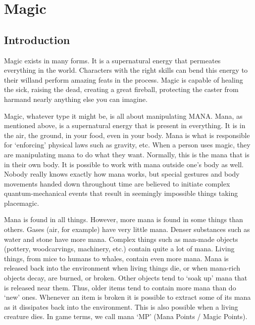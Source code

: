 \documentclass[twoside]{book}
\begin{document}
    

\chapter{Magic}
    
    

\section{Introduction}
    
    {  
      Magic exists in many forms. It is a supernatural
             energy that permeates everything in the world. Characters
             with the right skills can bend this energy to their
             willand perform amazing feats in the process. Magic
             is capable of healing the sick, raising the dead, creating a
             great fireball, protecting the caster from harmand
             nearly anything else you can imagine. 
    }
  
    {  
      Magic, whatever type it might be, is all about
             manipulating MANA. Mana, as mentioned above, is a
             supernatural energy that is present in everything. It is in
             the air, the ground, in your food, even in your body. Mana
             is what is responsible for `enforcing' physical
             laws such as gravity, etc. When a person uses magic, they
             are manipulating mana to do what they want. Normally, this
             is the mana that is in their own body. It is possible to
             work with mana outside one's body as well. Nobody
             really knows exactly how mana works, but special gestures
             and body movements handed down throughout time are believed
             to initiate complex quantum-mechanical events that result in
             seemingly impossible things taking placemagic.
             
    }
  
    {  
      Mana is found in all things. However, more mana is
             found in some things than others. Gases (air, for example)
             have very little mana. Denser substances such as water and
             stone have more mana. Complex things such as man-made
             objects (pottery, woodcarvings, machinery, etc.) contain
             quite a lot of mana. Living things, from mice to humans to
             whales, contain even more mana. Mana is released back into
             the environment when living things die, or when mana-rich
             objects decay, are burned, or broken. Other objects tend to
             `soak up' mana that is released near them. Thus,
             older items tend to contain more mana than do
             `new' ones. Whenever an item is broken it is
             possible to extract some of its mana as it dissipates back
             into the environment. This is also possible when a living
             creature dies. In game terms, we call mana `MP'
             (Mana Points / Magic Points). 
    }
  
\end{document}
